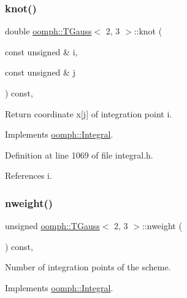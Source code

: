 \subsubsection{\texorpdfstring{knot()}{knot()}}
{\footnotesize\ttfamily double \hyperlink{classoomph_1_1TGauss}{oomph\+::\+T\+Gauss}$<$ 2, 3 $>$\+::knot (\begin{DoxyParamCaption}\item[{const unsigned \&}]{i,  }\item[{const unsigned \&}]{j }\end{DoxyParamCaption}) const\hspace{0.3cm}{\ttfamily [inline]}, {\ttfamily [virtual]}}



Return coordinate x\mbox{[}j\mbox{]} of integration point i. 



Implements \hyperlink{classoomph_1_1Integral_a1a2122f99a87c18649bafdd9ed739758}{oomph\+::\+Integral}.



Definition at line 1069 of file integral.\+h.



References i.

\mbox{\label{classoomph_1_1TGauss_3_012_00_013_01_4_a1ddb7c086c6655968614721a7b1f7716}} 
\subsubsection{\texorpdfstring{nweight()}{nweight()}}
{\footnotesize\ttfamily unsigned \hyperlink{classoomph_1_1TGauss}{oomph\+::\+T\+Gauss}$<$ 2, 3 $>$\+::nweight (\begin{DoxyParamCaption}{ }\end{DoxyParamCaption}) const\hspace{0.3cm}{\ttfamily [inline]}, {\ttfamily [virtual]}}



Number of integration points of the scheme. 



Implements \hyperlink{classoomph_1_1Integral_a1a270de9d99a1fcf1d25a6c1017f65fa}{oomph\+::\+Integral}.



